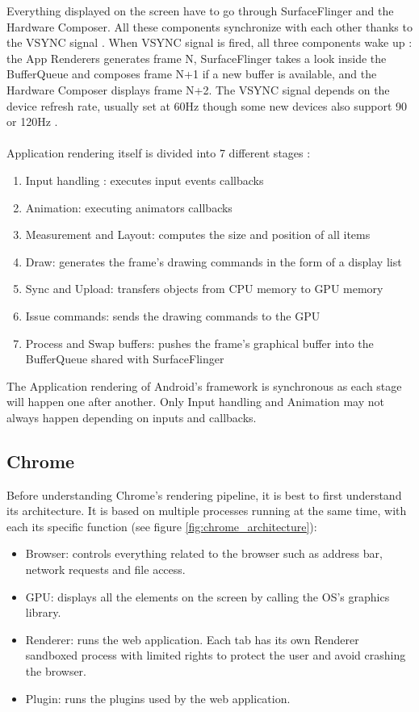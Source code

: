 \documentclass{kththesis}
\begin{document}

Everything displayed on the screen have to go through SurfaceFlinger and the Hardware Composer.
All these components synchronize with each other thanks to the VSYNC signal \cite{vsync}. When VSYNC signal is fired, all three components wake up : the App Renderers generates frame N, SurfaceFlinger takes a look inside the BufferQueue and composes frame N+1 if a new buffer is available, and the Hardware Composer displays frame N+2. The VSYNC signal depends on the device refresh rate, usually set at 60Hz though some new devices also support 90 or 120Hz \cite{refresh_rate}.

\paragraph{}
Application rendering itself is divided into 7 different stages \cite{app_rendering}:
\begin{enumerate}
    \item Input handling : executes input events callbacks
    \item Animation: executing animators callbacks
    \item Measurement and Layout: computes the size and position of all items
    \item Draw: generates the frame's drawing commands in the form of a display list
    \item Sync and Upload: transfers objects from CPU memory to GPU memory
    \item Issue commands: sends the drawing commands to the GPU
    \item Process and Swap buffers: pushes the frame's graphical buffer into the BufferQueue shared with SurfaceFlinger
\end{enumerate}

The Application rendering of Android's framework is synchronous as each stage will happen one after another. Only Input handling and Animation may not always happen depending on inputs and callbacks.

\subsection{Chrome}
Before understanding Chrome's rendering pipeline, it is best to first understand its architecture. It is based on multiple processes running at the same time, with each its specific function \cite{chrome_architecture} (see figure \ref{fig:chrome_architecture}):
\begin{itemize}
    \item Browser: controls everything related to the browser such as address bar, network requests and file access.
    \item GPU: displays all the elements on the screen by calling the OS's graphics library.
    \item Renderer: runs the web application. Each tab has its own Renderer sandboxed process with limited rights to protect the user and avoid crashing the browser.
    \item Plugin: runs the plugins used by the web application.
\end{itemize}
\end{document}
